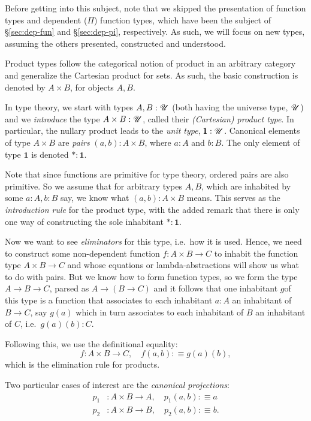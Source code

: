 Before getting into this subject, note that we skipped the presentation of
function types and dependent ($\Pi$) function types, which have been the subject
of \S\ref{sec:dep-fun} and \S\ref{sec:dep-pi}, respectively. As such, we will
focus on new types, assuming the others presented, constructed and understood.

Product types follow the categorical notion of product in an arbitrary
category and generalize the Cartesian product for sets. As such, the basic
construction is denoted by $ A \times B $, for objects $ A, B $.

In type theory, we start with types $ A, B : \mathscr{U} $ (both having the
universe type, $ \mathscr{U} $) and we \emph{introduce} the type
$ A \times B : \mathscr{U} $, called their \emph{(Cartesian) product type}.
In particular, the nullary product leads to the \emph{unit type},
$ \pmb{1} : \mathscr{U} $. Canonical elements of type $ A \times B $
are \emph{pairs} $ (a, b) : A \times B $, where $ a : A $ and $ b : B $.
The only element of type $ \pmb{1} $ is denoted $ \ast : \pmb{1} $.

Note that since functions are primitive for type theory, ordered pairs
are also primitive. So we assume that for arbitrary types $ A, B $,
which are inhabited by some $ a : A, b : B $ say, we know what
$ (a, b) : A \times B $ means. This serves as the \emph{introduction rule}
for the product type, with the added remark that there is only one way
of constructing the sole inhabitant  $ \ast :  \pmb{1} $.

Now we want to see \emph{eliminators} for this type, i.e.\ how it is used.
Hence, we need to construct some non-dependent function $ f : A \times B \to C $
to inhabit the function type $ A \times B \to C $ and whose equations or
lambda-abstractions will show us what to do with pairs. But we know how to
form function types, so we form the type $ A \to B \to C $, parsed as
$ A \to (B \to C) $ and it follows that one inhabitant $ g $of this type is a
function that associates to each inhabitant $ a : A $ an inhabitant of
$ B \to C $, say $ g(a) $ which in turn associates to each inhabitant of $ B $ an
inhabitant of $ C $, i.e.\ $ g(a)(b) : C $.

Following this, we use the definitional equality:
\[
  f: A \times B \to C, \quad f(a, b) :\equiv g(a)(b),
\]
which is the elimination rule for products.

Two particular cases of interest are the \emph{canonical projections}:
\begin{align*}
  p_1 & : A \times B \to A, \quad p_1(a, b) :\equiv a \\
  p_2 & : A \times B \to B, \quad p_2(a, b) :\equiv b.
\end{align*}

